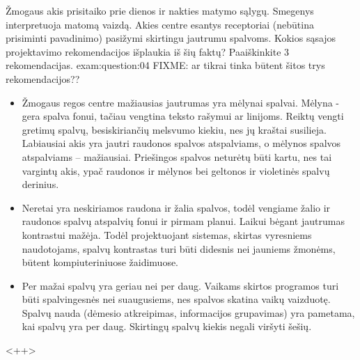 \begin{question}{%
  Žmogaus akis prisitaiko prie dienos ir nakties matymo sąlygų. Smegenys
  interpretuoja matomą vaizdą. Akies centre esantys receptoriai
  (nebūtina prisiminti pavadinimo) pasižymi skirtingu jautrumu spalvoms.
  Kokios sąsajos projektavimo rekomendacijos išplaukia iš šių faktų?
  Paaiškinkite 3 rekomendacijas.
  }{exam:question:04}
  FIXME: ar tikrai tinka būtent šitos trys rekomendacijos??
    \begin{itemize}
      \item{
        Žmogaus regos centre mažiausias jautrumas yra mėlynai spalvai. Mėlyna - gera
        spalva fonui, tačiau vengtina teksto rašymui ar linijoms.
        Reiktų vengti gretimų spalvų, besiskiriančių melsvumo kiekiu, nes jų kraštai 
        susilieja. Labiausiai akis yra jautri raudonos spalvos atspalviams, o mėlynos 
        spalvos atspalviams – mažiausiai. Priešingos spalvos neturėtų būti kartu, nes 
        tai vargintų akis, ypač raudonos ir mėlynos bei geltonos ir violetinės spalvų 
        derinius.
        }
      \item{
        Neretai yra neskiriamos raudona ir žalia spalvos, todėl vengiame žalio ir 
        raudonos spalvų atspalvių fonui ir pirmam planui.
        Laikui bėgant jautrumas kontrastui mažėja. Todėl projektuojant sistemas, 
        skirtas vyresniems naudotojams, spalvų kontrastas turi būti didesnis nei jauniems 
        žmonėms, būtent kompiuteriniuose žaidimuose.
        }
      \item{Per mažai spalvų yra geriau nei per daug. Vaikams  skirtos programos 
        turi būti spalvingesnės nei suaugusiems, nes spalvos skatina vaikų vaizduotę. 
        Spalvų nauda (dėmesio atkreipimas, informacijos grupavimas) yra pametama, kai 
        spalvų yra per daug. Skirtingų spalvų kiekis negali viršyti šešių.
        }
    \end{itemize}
  <++>
\end{question}

